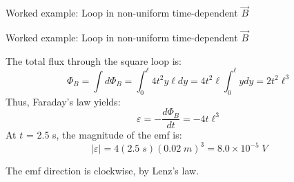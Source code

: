 {\begin{frame}{Worked example: Loop in non-uniform time-dependent $\vec{B}$}
\end{frame}

%
%
%

\begin{frame}{Worked example: Loop in non-uniform time-dependent $\vec{B}$}

  The total flux through the square loop is:
  \begin{equation*}
     \Phi_{B} = \int d\Phi_{B} = \int_{0}^{\ell} 4 t^2 y \ell dy
              = 4 t^2 \ell \int_{0}^{\ell} y dy
              = 2 t^2 \ell^3
  \end{equation*}
  Thus, Faraday's law yields:
  \begin{equation*}
    \varepsilon = - \frac{d\Phi_{B}}{dt} = - 4 t \ell^3
  \end{equation*}
  At $t$ = 2.5 s, the magnitude of the emf is:
  \begin{equation*}
    |\varepsilon| = 4 (2.5 \; s) (0.02 \; m)^3 = 8.0 \times 10^{-5} \; V
  \end{equation*}

  The emf direction is clockwise, by Lenz's law.

\end{frame}

} %


%
%

